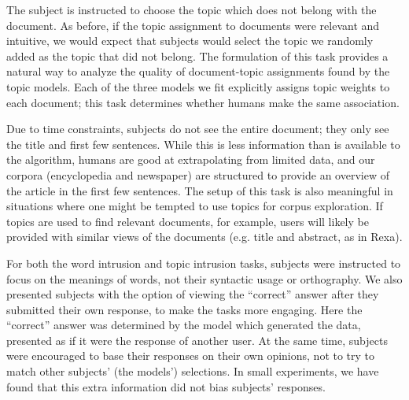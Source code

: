
The subject is instructed to choose the topic which does not belong
with the document.  As before, if the topic assignment to documents
were relevant and intuitive, we would expect that subjects would
select the topic we randomly added as the topic that did not belong.
The formulation of this task provides a natural way to analyze the
quality of document-topic assignments found by the topic models.  Each
of the three models we fit explicitly assigns topic weights to each
document; this task determines whether humans make the same
association.

Due to time constraints, subjects do not see the entire document; they only
see the title and first few sentences.  While this is less information than is
available to the algorithm, humans are good at extrapolating from limited
data, and our corpora (encyclopedia and newspaper) are structured to provide
an overview of the article in the first few sentences.  The setup of this task
is also meaningful in situations where one might be tempted to use topics for
corpus exploration.  If topics are used to find relevant
documents, for example, users will likely be provided with similar views of the
documents (e.g. title and abstract, as in Rexa).


For both the word intrusion and topic intrusion tasks, subjects were
instructed to focus on the meanings of words, not their syntactic
usage or orthography.  We also presented subjects with the option of
viewing the ``correct'' answer after they submitted their own
response, to make the tasks more engaging.  Here the ``correct''
answer was determined by the model which generated the data, presented
as if it were the response of another user.  At the same time,
subjects were encouraged to base their responses on their own
opinions, not to try to match other subjects' (the models')
selections.  In small experiments, we have found that this extra
information did not bias subjects' responses.

